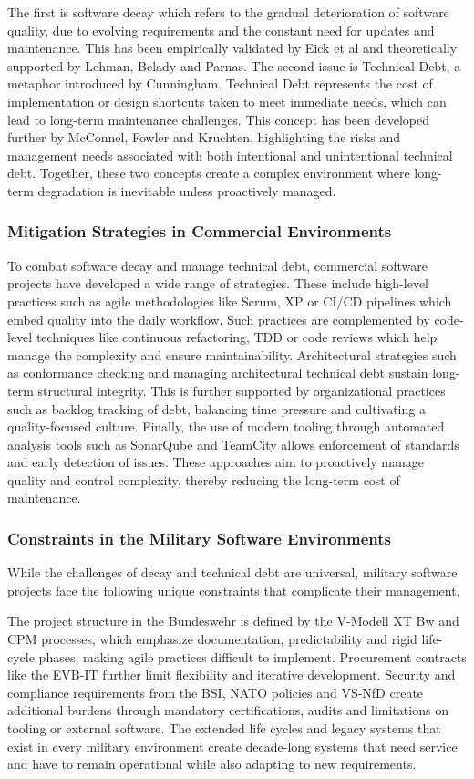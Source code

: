 The first is software decay which refers to the gradual deterioration of software quality, due to evolving requirements and the constant need for updates and maintenance. This has been empirically validated by Eick et al and theoretically supported by Lehman, Belady and Parnas.
The second issue is Technical Debt, a metaphor introduced by Cunningham. Technical Debt represents the cost of implementation or design shortcuts taken to meet immediate needs, which can lead to long-term maintenance challenges. This concept has been developed further by McConnel, Fowler and Kruchten, highlighting the risks and management needs
associated with both intentional and unintentional technical debt. Together, these two concepts create a complex environment where long-term degradation is inevitable unless proactively managed.

\subsubsection{Mitigation Strategies in Commercial Environments}
To combat software decay and manage technical debt, commercial software projects have developed a wide range of strategies. These include high-level practices such as agile methodologies like Scrum, \ac{XP} or CI/CD pipelines which embed quality into the daily workflow.
Such practices are complemented by code-level techniques like continuous refactoring, \ac{TDD} or code reviews which help manage the complexity and ensure maintainability. Architectural strategies such as conformance checking and managing architectural technical debt sustain long-term structural integrity.
This is further supported by organizational practices such as backlog tracking of debt, balancing time pressure and cultivating a quality-focused culture. Finally, the use of modern tooling through automated analysis tools such as SonarQube and TeamCity allows enforcement of standards and early detection of issues.
These approaches aim to proactively manage quality and control complexity, thereby reducing the long-term cost of maintenance. 

\subsubsection{Constraints in the Military Software Environments}
While the challenges of decay and technical debt are universal, military software projects face the following unique constraints that complicate their management.

The project structure in the Bundeswehr is defined by the V-Modell XT Bw and \ac{CPM} processes, which emphasize documentation, predictability and rigid life-cycle phases, making agile practices difficult to implement.
Procurement contracts like the \ac{EVB-IT} further limit flexibility and iterative development. Security and compliance requirements from the BSI, NATO policies and VS-NfD create additional burdens through mandatory certifications, audits and limitations on tooling or external software.
The extended life cycles and legacy systems that exist in every military environment create decade-long systems that need service and have to remain operational while also adapting to new requirements.

